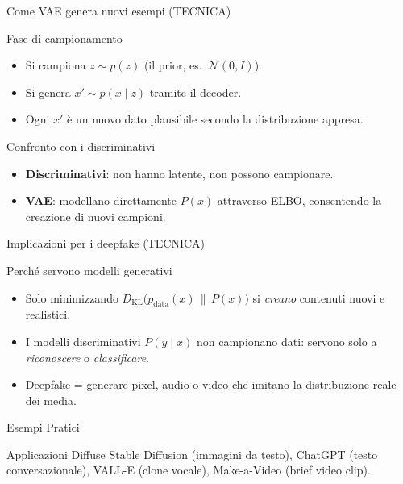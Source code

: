 \documentclass[12pt]{beamer}
\begin{document}
\begin{frame}{Come VAE genera nuovi esempi (TECNICA) }
  \begin{alertblock}{Fase di campionamento}
    \begin{itemize}
      \item Si campiona \(z \sim p(z)\) (il prior, es.\ \(\mathcal{N}(0,I)\)).  
      \item Si genera \(x' \sim p(x\mid z)\) tramite il decoder.  
      \item Ogni \(x'\) è un nuovo dato plausibile secondo la distribuzione appresa.
    \end{itemize}
  \end{alertblock}
  \begin{alertblock}{Confronto con i discriminativi}
    \(\)
    \begin{itemize}
      \item \textbf{Discriminativi}: non hanno latente, non possono campionare.  
      \item \textbf{VAE}: modellano direttamente \(P(x)\) attraverso ELBO, consentendo la creazione di nuovi campioni.
    \end{itemize}
  \end{alertblock}
\end{frame}

\begin{frame}{Implicazioni per i deepfake (TECNICA)}
  \begin{alertblock}{Perché servono modelli generativi}
    \begin{itemize}
      \item Solo minimizzando \(D_{\mathrm{KL}}\bigl(p_{\mathrm{data}}(x)\,\|\,P(x)\bigr)\) si \emph{creano} contenuti nuovi e realistici.
      \item I modelli discriminativi \(P(y\mid x)\) non campionano dati: servono solo a \emph{riconoscere} o \emph{classificare}.
      \item Deepfake = generare pixel, audio o video che imitano la distribuzione reale dei media.
    \end{itemize}
  \end{alertblock}
\end{frame}



\begin{frame}{Esempi Pratici}
  \begin{alertblock}{Applicazioni Diffuse}
    Stable Diffusion (immagini da testo), ChatGPT (testo conversazionale), VALL-E (clone vocale), Make-a-Video (brief video clip).
  \end{alertblock}
\end{frame}
\end{document}

